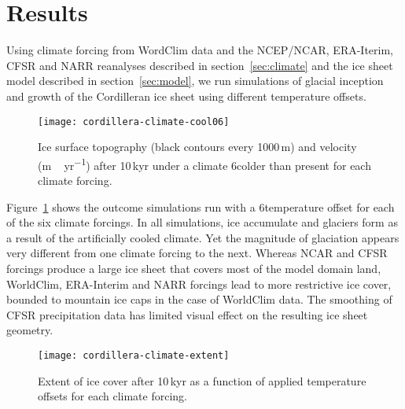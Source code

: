 
\section{Results}
\label{sec:results}

Using climate forcing from WordClim data and the NCEP/NCAR, ERA-Iterim, CFSR and NARR reanalyses described in section~\ref{sec:climate} and the ice sheet model described in section~\ref{sec:model}, we run simulations of glacial inception and growth of the Cordilleran ice sheet using different temperature offsets.

\begin{figure}[t]
	\vspace*{2mm}
	\begin{center}
		\texttt{[image: cordillera-climate-cool06]}
	\end{center}
	\caption{Ice surface topography (black contours every 1000\,m) and velocity (\unit{m\,yr^{-1}}) after 10\,kyr under a climate 6\degC colder than present for each climate forcing.}
	\label{fig:cool06}
\end{figure}

Figure~\ref{fig:cool06} shows the outcome simulations run with a 6\degC temperature offset for each of the six climate forcings. In all simulations, ice accumulate and glaciers form as a result of the artificially cooled climate. Yet the magnitude of glaciation appears very different from one climate forcing to the next. Whereas NCAR and CFSR forcings produce a large ice sheet that covers most of the model domain land, WorldClim, ERA-Interim and NARR forcings lead to more restrictive ice cover, bounded to mountain ice caps in the case of WorldClim data. The smoothing of CFSR precipitation data has limited visual effect on the resulting ice sheet geometry.

\begin{figure}[t]
	\vspace*{2mm}
	\begin{center}
		\texttt{[image: cordillera-climate-extent]}
	\end{center}
	\caption{Extent of ice cover after 10\,kyr as a function of applied temperature offsets for each climate forcing.}
	\label{fig:extent}
\end{figure}

